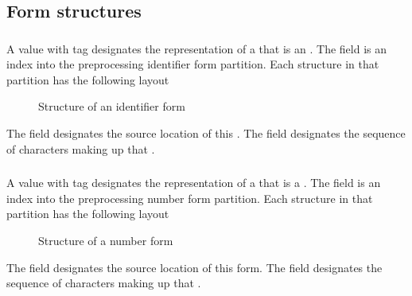 \subsection{Form structures}
\label{sec:ifc-form-structures}

\subsubsection{}
\label{sec:ifc:FormSort:Identifier}

A  value with tag  designates
the representation of a  that 
is an .  The  field is an index into
the preprocessing identifier form partition.  Each structure in that partition
has the following layout
%
\begin{figure}[H]
  \centering
  \caption{Structure of an identifier form}
  \label{fig:ifc-identifier-form}
\end{figure}

The field  designates the source location of this 
.  The
field  designates the sequence of characters making up that 
. 


\subsubsection{}
\label{sec:ifc:FormSort:Number}

A  value with tag  designates
the representation of a  that 
is a .  The  field is an index into
the preprocessing number form partition.  Each structure in that partition
has the following layout
%
\begin{figure}[H]
  \centering
  \caption{Structure of a number form}
  \label{fig:ifc-number-form}
\end{figure}

The field  designates the source location of this form.  The
field  designates the sequence of characters making up that 
. 


